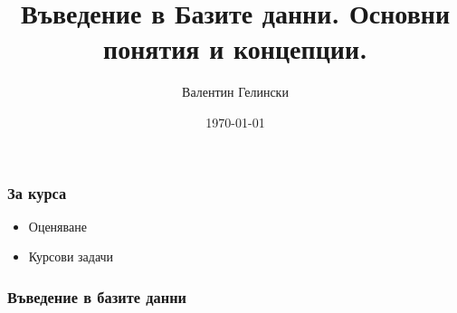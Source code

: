 \documentclass{beamer}
\title{Въведение в Базите данни. Основни понятия и концепции.}
\author{Валентин Гелински}
\institute{ТУ София}
\date{\today}
\begin{document}
  \begin{frame} 
    \titlepage
  \end{frame}

  \begin{frame}
    \frametitle{За курса}
    \begin{itemize}
      \item{Оценяване}
      \item{Курсови задачи}
    \end{itemize}
  \end{frame}

  \begin{frame}
    \frametitle{Въведение в базите данни}
    
  \end{frame}
\end{document}
